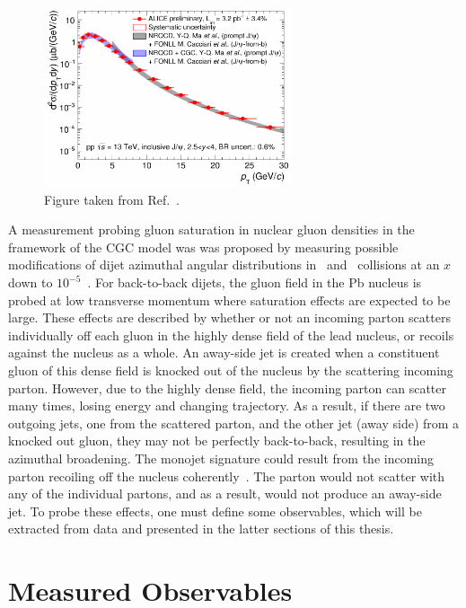 \begin{figure}
	\centering
	\includegraphics[width=0.65\textwidth]{figures/jpsialice.pdf} 
	\caption{ Figure taken from Ref.~\cite{Weber:2017kjj}. }	
	\label{fig:jpsialice}
\end{figure}

A measurement probing gluon saturation in nuclear gluon densities in the framework of the CGC model was  was proposed by measuring possible modifications of dijet azimuthal angular distributions in \pPb\ and \pp\ collisions at an $x$ down to $10^{-5}$~\cite{vanHameren:2014lna,}. For back-to-back dijets, the gluon field in the Pb nucleus is probed at low transverse momentum where saturation effects are expected to be large. These effects are described by whether or not an incoming parton scatters individually off each gluon in the highly dense field of the lead nucleus, or recoils against the nucleus as a whole. An away-side jet is created when a constituent gluon of this dense field is knocked out of the nucleus by the scattering incoming parton. However, due to the highly dense field, the incoming parton can scatter many times, losing energy and changing trajectory. As a result, if there are two outgoing jets, one from the scattered parton, and the other jet (away side) from a knocked out gluon, they may not be perfectly back-to-back, resulting in the azimuthal broadening. The monojet signature could result from the incoming parton recoiling off the nucleus coherently~\cite{Kharzeev:2004bw}. The parton would not scatter with any of the individual partons, and as a result, would not produce an away-side jet. To probe these effects, one must define some observables, which will be extracted from data and presented in the latter sections of this thesis.

\section{Measured Observables}

